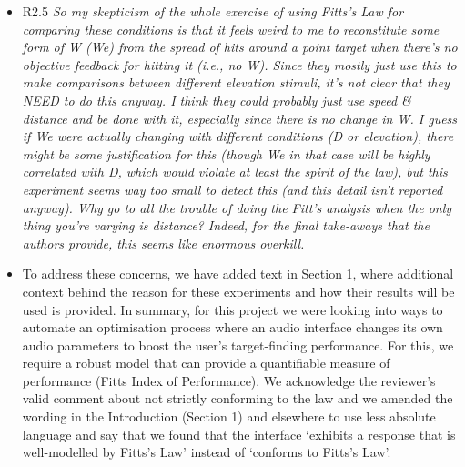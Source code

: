 \documentclass{scrartcl}
\begin{document}
\begin{itemize}
  \item R2.5 \textit{So my skepticism of the whole exercise of using Fitts’s Law for comparing these conditions is that it feels weird to me to reconstitute some form of W (We) from the spread of hits around a point target when there’s no objective feedback for hitting it (i.e., no W). Since they mostly just use this to make comparisons between different elevation stimuli, it’s not clear that they NEED to do this anyway. I think they could probably just use speed \& distance and be done with it, especially since there is no change in W. I guess if We were actually changing with different conditions (D or elevation), there might be some justification for this (though We in that case will be highly correlated with D, which would violate at least the spirit of the law), but this experiment seems way too small to detect this (and this detail isn’t reported anyway). Why go to all the trouble of doing the Fitt’s analysis when the only thing you’re varying is distance? Indeed, for the final take-aways that the authors provide, this seems like enormous overkill.}
  \item[] To address these concerns, we have added text in Section 1, where additional context behind the reason for these experiments and how their results will be used is provided. 
    In summary, for this project we were looking into ways to automate an optimisation process where an audio interface changes its own audio parameters to boost the user's target-finding performance.
    For this, we require a robust model that can provide a quantifiable measure of performance (Fitts Index of Performance).
    We acknowledge the reviewer's valid comment about not strictly conforming to the law and we amended the wording in the Introduction (Section 1) and elsewhere to use less absolute language and say that we found that the interface `exhibits a response that is well-modelled by Fitts’s Law'  instead of `conforms to Fitts's Law'.


\end{itemize}
\end{document}
